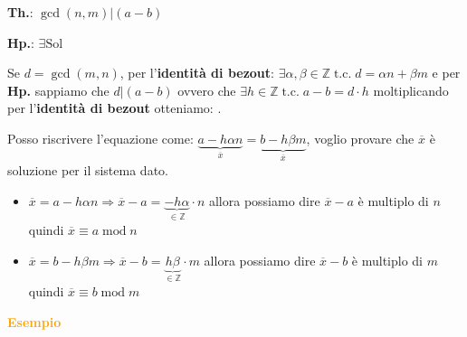 \begin{flushleft}
\begin{boxA}
        {\centering
            \begin{minipage}[t]{0.45\textwidth}
                \textbf{Th.}: $\gcd (n, m) | (a - b)$
            \end{minipage}
            \hfill
            \begin{minipage}[t]{0.45\textwidth}
                \textbf{Hp.}: $\exists \text{Sol}$
            \end{minipage}
        \par}
        Se $d = \gcd (m, n)$, per l'\textbf{identità di bezout}: $\exists \alpha, \beta \in \mathbb{Z} \; \text{t.c.} \; d = \alpha n + \beta m$ e per \textbf{Hp.} sappiamo che $d|(a - b)$ ovvero che $\exists h \in \mathbb{Z} \; \text{t.c.} \; a - b = d \cdot h$ moltiplicando per l'\textbf{identità di bezout} otteniamo: .

        Posso riscrivere l'equazione come: $\underset{\overline{x}}{\underbrace{a - h \alpha n}} = \underset{\overline{x}}{\underbrace{b - h \beta m}}$, voglio provare che $\overline{x}$ è soluzione per il sistema dato.
        \begin{itemize}[nosep]
            \item $\overline{x} = a - h \alpha n \Rightarrow \overline{x} - a = \underset{\in \mathbb{Z}}{\underbrace{-h \alpha}} \cdot n$ allora possiamo dire $\overline{x} - a$ è multiplo di $n$ quindi $\overline{x} \equiv a \; \text{mod} \; n$
            \item $\overline{x} = b - h \beta m \Rightarrow \overline{x} - b = \underset{\in \mathbb{Z}}{\underbrace{h \beta}} \cdot m$ allora possiamo dire $\overline{x} - b$ è multiplo di $m$ quindi $\overline{x} \equiv b \; \text{mod} \; m$
        \end{itemize}
    \end{boxA}
    \begin{boxA}
        \textcolor{orange}{\textbf{Esempio}} 


\end{boxA}
\end{flushleft}

